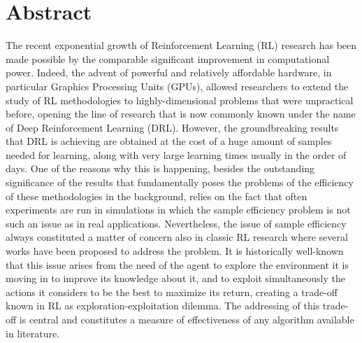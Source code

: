 \chapter*{Abstract}
The recent exponential growth of Reinforcement Learning (RL) research has been made possible by the comparable significant improvement in computational power. Indeed, the advent of powerful and relatively affordable hardware, in particular Graphics Processing Units (GPUs), allowed researchers to extend the study of RL methodologies to highly-dimensional problems that were unpractical before, opening the line of research that is now commonly known under the name of Deep Reinforcement Learning (DRL). However, the groundbreaking results that DRL is achieving are obtained at the cost of a huge amount of samples needed for learning, along with very large learning times usually in the order of days. One of the reasons why this is happening, besides the outstanding significance of the results that fundamentally poses the problems of the efficiency of these methodologies in the background, relies on the fact that often experiments are run in simulations in which the sample efficiency problem is not such an issue as in real applications. Nevertheless, the issue of sample efficiency always constituted a matter of concern also in classic RL research where several works have been proposed to address the problem. It is historically well-known that this issue arises from the need of the agent to explore the environment it is moving in to improve its knowledge about it, and to exploit simultaneously the actions it considers to be the best to maximize its return, creating a trade-off known in RL as exploration-exploitation dilemma. The addressing of this trade-off is central and constitutes a measure of effectiveness of any algorithm available in literature. 

